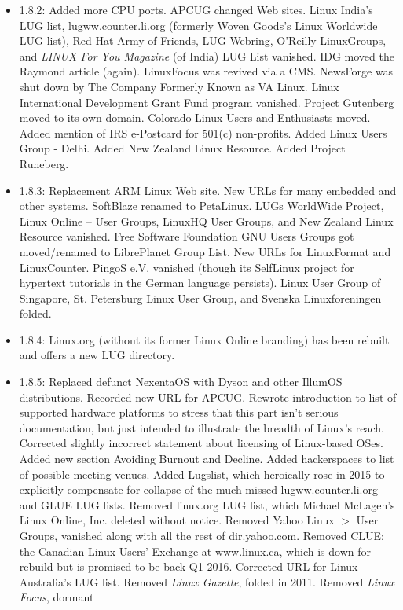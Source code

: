 \begin{itemize}
\item 1.8.2:  Added more CPU ports.  APCUG changed Web sites.  Linux India's LUG list, lugww.counter.li.org (formerly Woven Goods's Linux Worldwide LUG list), Red Hat Army of Friends, LUG Webring, O'Reilly LinuxGroups, and {\itshape LINUX For You Magazine\/} (of India) LUG List vanished.  IDG moved the Raymond article (again).  LinuxFocus was revived via a CMS.  NewsForge was shut down by The Company Formerly Known as VA Linux.  Linux International Development Grant Fund program vanished.  Project Gutenberg moved to its own domain.  Colorado Linux Users and Enthusiasts moved.  Added mention of IRS e-Postcard for 501(c) non-profits.  Added Linux Users Group - Delhi.  Added New Zealand Linux Resource.  Added Project Runeberg.
\item 1.8.3:  Replacement ARM Linux Web site.  New URLs for many embedded and other systems.  SoftBlaze renamed to PetaLinux.  LUGs WorldWide Project, Linux Online -- User Groups, LinuxHQ User Groups, and New Zealand Linux Resource vanished.  Free Software Foundation GNU Users Groups got moved/renamed to LibrePlanet Group List.  New URLs for LinuxFormat and LinuxCounter.  PingoS e.V. vanished (though its SelfLinux project for hypertext tutorials in the German language persists).  Linux User Group of Singapore, St. Petersburg Linux User Group, and Svenska Linuxforeningen folded.
\item 1.8.4:  Linux.org (without its former Linux Online branding) has been rebuilt and offers a new LUG directory.
\item 1.8.5:  Replaced defunct NexentaOS with Dyson and other
IllumOS distributions.  Recorded new URL for APCUG.  Rewrote introduction
to list of supported hardware platforms to stress that this part isn't
serious documentation, but just intended to illustrate the breadth of
Linux's reach.  Corrected slightly incorrect statement about licensing of
Linux-based OSes.  Added new section Avoiding Burnout and Decline.
Added hackerspaces to list of possible meeting venues.  Added Lugslist, which
heroically rose in 2015 to explicitly compensate for collapse of the
much-missed lugww.counter.li.org and GLUE LUG lists.  Removed linux.org
LUG list, which Michael McLagen's Linux Online, Inc. deleted without notice.
Removed Yahoo Linux $>$ User Groups, vanished along with all the rest of
dir.yahoo.com.  Removed CLUE: the Canadian Linux Users' Exchange at 
www.linux.ca, which is down for rebuild but is promised to be back Q1
2016.  Corrected URL for Linux Australia's LUG list.  Removed {\itshape Linux
Gazette\/}, folded in 2011.  Removed {\itshape Linux Focus\/}, dormant

\end{itemize}
